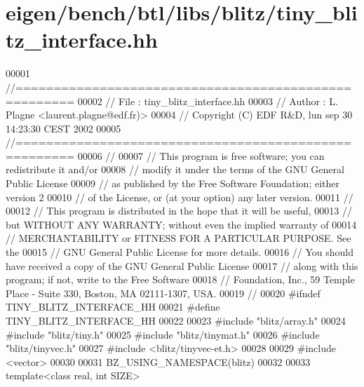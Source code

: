 \hypertarget{eigen_2bench_2btl_2libs_2blitz_2tiny__blitz__interface_8hh_source}{}\section{eigen/bench/btl/libs/blitz/tiny\+\_\+blitz\+\_\+interface.hh}
\label{eigen_2bench_2btl_2libs_2blitz_2tiny__blitz__interface_8hh_source}

\begin{DoxyCode}
00001 \textcolor{comment}{//=====================================================}
00002 \textcolor{comment}{// File   :  tiny\_blitz\_interface.hh}
00003 \textcolor{comment}{// Author :  L. Plagne <laurent.plagne@edf.fr)>}
00004 \textcolor{comment}{// Copyright (C) EDF R&D,  lun sep 30 14:23:30 CEST 2002}
00005 \textcolor{comment}{//=====================================================}
00006 \textcolor{comment}{//}
00007 \textcolor{comment}{// This program is free software; you can redistribute it and/or}
00008 \textcolor{comment}{// modify it under the terms of the GNU General Public License}
00009 \textcolor{comment}{// as published by the Free Software Foundation; either version 2}
00010 \textcolor{comment}{// of the License, or (at your option) any later version.}
00011 \textcolor{comment}{//}
00012 \textcolor{comment}{// This program is distributed in the hope that it will be useful,}
00013 \textcolor{comment}{// but WITHOUT ANY WARRANTY; without even the implied warranty of}
00014 \textcolor{comment}{// MERCHANTABILITY or FITNESS FOR A PARTICULAR PURPOSE.  See the}
00015 \textcolor{comment}{// GNU General Public License for more details.}
00016 \textcolor{comment}{// You should have received a copy of the GNU General Public License}
00017 \textcolor{comment}{// along with this program; if not, write to the Free Software}
00018 \textcolor{comment}{// Foundation, Inc., 59 Temple Place - Suite 330, Boston, MA  02111-1307, USA.}
00019 \textcolor{comment}{//}
00020 \textcolor{preprocessor}{#ifndef TINY\_BLITZ\_INTERFACE\_HH}
00021 \textcolor{preprocessor}{#define TINY\_BLITZ\_INTERFACE\_HH}
00022 
00023 \textcolor{preprocessor}{#include "blitz/array.h"}
00024 \textcolor{preprocessor}{#include "blitz/tiny.h"}
00025 \textcolor{preprocessor}{#include "blitz/tinymat.h"}
00026 \textcolor{preprocessor}{#include "blitz/tinyvec.h"}
00027 \textcolor{preprocessor}{#include <blitz/tinyvec-et.h>}
00028 
00029 \textcolor{preprocessor}{#include <vector>}
00030 
00031 BZ\_USING\_NAMESPACE(blitz)
00032 
00033 \textcolor{keyword}{template}<\textcolor{keyword}{class} real, \textcolor{keywordtype}{int} SIZE>

\end{DoxyCode}

